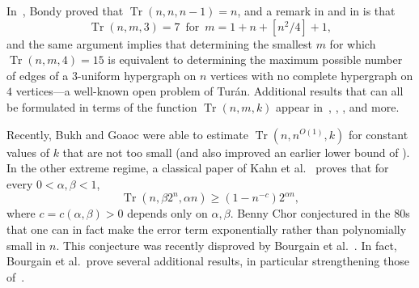 \documentclass[11pt]{article}
\newcommand{\FF}{{\cal F}}
\renewcommand{\a}{\alpha}
\renewcommand{\d}{\delta}
\DeclareMathOperator{\trace}{Tr}
\begin{document}
In~\cite{Bo}, Bondy proved that $\trace(n,n,n-1)=n$, and a
remark in \cite{Al} and in \cite{Fr} is that
$$
\trace(n,m,3)=7\, \text{ for } \,m=1+n+[n^2/4]+1,
$$
and the same argument implies that
determining the smallest $m$ for which $\trace(n,m,4)=15$ is equivalent
to determining the maximum possible number of edges of a
$3$-uniform hypergraph  on $n$ vertices with no complete hypergraph
on $4$ vertices---a well-known open problem of Tur\'an. Additional results
that can all be formulated in terms of the function $\trace(n,m,k)$ 
appear in~\cite{BR}, \cite{KKL}, \cite{BKK}, \cite{CGN} and more.

Recently, Bukh and Goaoc 
were able to estimate $\trace(n,n^{O(1)},k)$ for constant values of $k$ that are not too small (and also improved an earlier lower bound of \cite{CGN}).
%
In the other extreme regime, a classical paper of Kahn et al.~\cite{KKL} proves that for every $0<\a, \beta<1$,
$$\trace(n, \beta 2^{n}, \a n) \ge (1-n^{-c})2^{\a n},$$
where $c=c(\a,\beta)>0$ depends only on $\a,\beta$.
Benny Chor conjectured in the 80s that one can in fact make the error term exponentially rather than polynomially small in $n$.
This conjecture was recently disproved by Bourgain et al.~\cite{BKK}. In fact, Bourgain et al.\ prove several additional
results, in particular strengthening those of~\cite{KKL}.
%
%
\end{document}
